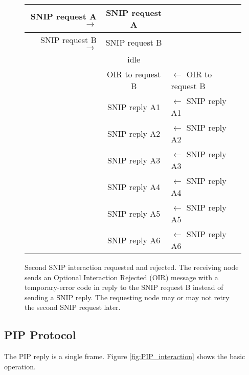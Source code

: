 \documentclass[11pt]{article}
\begin{document}
\begin{figure}[!htbp]
\begin{center}
\begin{tabular}{ r | c | l}
\hline
SNIP request A$\rightarrow$ & SNIP request A& \\ \hline
SNIP request B$\rightarrow$ & SNIP request B & \\ \hline

    & idle & \\ \hline

    & OIR to request B & $\leftarrow$ OIR to request B \\ \hline
    & SNIP reply A1  & $\leftarrow$ SNIP reply A1 \\ \hline
    & SNIP reply A2  & $\leftarrow$ SNIP reply A2 \\ \hline
    & SNIP reply A3  & $\leftarrow$ SNIP reply A3 \\ \hline
    & SNIP reply A4  & $\leftarrow$ SNIP reply A4 \\ \hline
    & SNIP reply A5  & $\leftarrow$ SNIP reply A5 \\ \hline
    & SNIP reply A6  & $\leftarrow$ SNIP reply A6 \\ \hline
\end{tabular}
\end{center}
\caption{Second SNIP interaction requested and rejected.
The receiving node sends an Optional Interaction Rejected (OIR)
message with a temporary-error code in reply to the SNIP
request B instead of sending a SNIP reply.
The requesting node may or may not retry the second SNIP request later.}
\label{fig:fast_double_SNIP_interaction_then_OIR}
\end{figure}

\clearpage
\subsection{PIP Protocol}

The PIP reply is a single frame.
Figure \ref{fig:PIP_interaction}
shows the basic operation.
\end{document}
